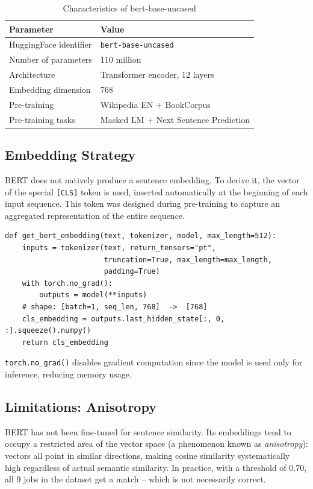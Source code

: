 \documentclass[12pt, a4paper]{report}
\begin{document}
\begin{table}[H]
\centering
\begin{tabular}{ll}
\toprule
\textbf{Parameter} & \textbf{Value} \\
\midrule
HuggingFace identifier & \texttt{bert-base-uncased} \\
Number of parameters & 110 million \\
Architecture & Transformer encoder, 12 layers \\
Embedding dimension & 768 \\
Pre-training & Wikipedia EN + BookCorpus \\
Pre-training tasks & Masked LM + Next Sentence Prediction \\
\bottomrule
\end{tabular}
\caption{Characteristics of bert-base-uncased}
\end{table}

\subsection{Embedding Strategy}

BERT does not natively produce a sentence embedding. To derive it,
the vector of the special \texttt{[CLS]} token is used, inserted
automatically at the beginning of each input sequence. This token was
designed during pre-training to capture an aggregated representation
of the entire sequence.

\begin{lstlisting}[caption={[CLS] embedding extraction from BERT}]
def get_bert_embedding(text, tokenizer, model, max_length=512):
    inputs = tokenizer(text, return_tensors="pt",
                       truncation=True, max_length=max_length,
                       padding=True)
    with torch.no_grad():
        outputs = model(**inputs)
    # shape: [batch=1, seq_len, 768]  ->  [768]
    cls_embedding = outputs.last_hidden_state[:, 0, :].squeeze().numpy()
    return cls_embedding
\end{lstlisting}

\texttt{torch.no\_grad()} disables gradient computation since
the model is used only for inference, reducing memory usage.

\subsection{Limitations: Anisotropy}
\label{sec:anisotropy}

BERT has not been fine-tuned for sentence similarity. Its
embeddings tend to occupy a restricted area of the vector space
(a phenomenon known as \emph{anisotropy}): vectors all point in
similar directions, making cosine similarity
systematically high regardless of actual semantic similarity. In
practice, with a threshold of 0.70, all 9 jobs in the dataset
get a match -- which is not necessarily correct.
\end{document}
